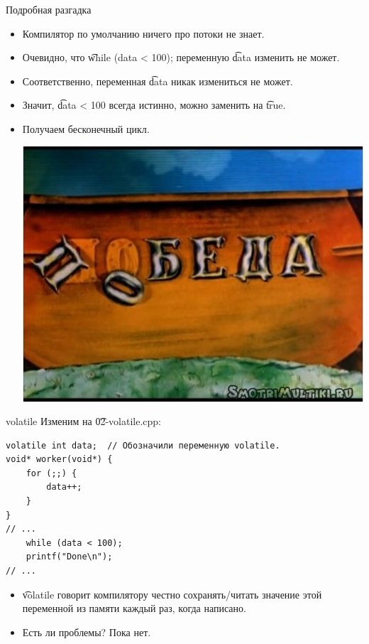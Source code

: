 \begin{frame}{Подробная разгадка}
	\begin{itemize}
		\item Компилятор по умолчанию ничего про потоки не знает.
		\item Очевидно, что \t{while (data < 100);} переменную \t{data} изменить не может.
		\item Соответственно, переменная \t{data} никак измениться не может.
		\item Значит, \t{data < 100} всегда истинно, можно заменить на \t{true}.
		\item Получаем бесконечный цикл.
			\begin{center}
				\includegraphics[scale=0.3]{win-lose.jpg}
			\end{center}
	\end{itemize}
\end{frame}

\begin{frame}[fragile]{volatile}
	Изменим на \t{02-volatile.cpp}:
\begin{verbatim}
volatile int data;  // Обозначили переменную volatile.
void* worker(void*) {
    for (;;) {
        data++;
    }
}
// ...
    while (data < 100);
    printf("Done\n");
// ...
\end{verbatim}
	\begin{itemize}
		\item \t{volatile} говорит компилятору честно сохранять/читать значение этой переменной из памяти каждый раз, когда написано.
		\item Есть ли проблемы? \pause Пока нет.
	\end{itemize}
\end{frame}

